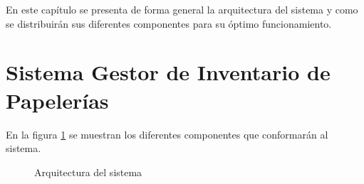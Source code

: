 En este capítulo se presenta de forma general la arquitectura del sistema y como se distribuirán sus diferentes componentes para su óptimo funcionamiento.

\section{Sistema Gestor de Inventario de Papelerías}

En la figura \ref{fig:Arquitectura} se muestran los diferentes componentes que conformarán al sistema.

\begin{figure}[hbtp!]
	\begin{center}	
		\label{fig:Arquitectura}
		\caption{Arquitectura del sistema}
	\end{center}
\end{figure}